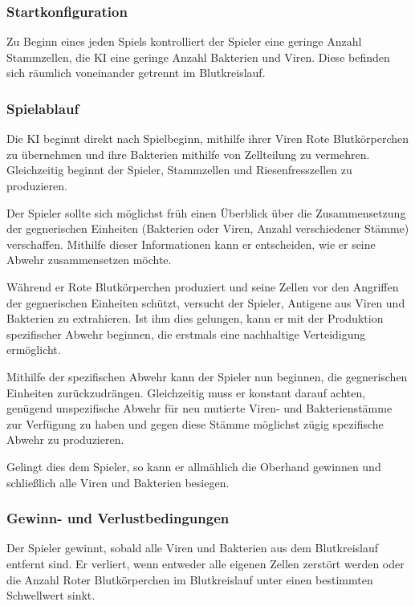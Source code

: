 \subsubsection{Startkonfiguration}

Zu Beginn eines jeden Spiels kontrolliert der Spieler eine geringe Anzahl
Stammzellen, die KI eine geringe Anzahl Bakterien und Viren. Diese befinden
sich räumlich voneinander getrennt im Blutkreislauf.

\subsubsection{Spielablauf}

Die KI beginnt direkt nach Spielbeginn, mithilfe ihrer Viren Rote
Blutkörperchen zu übernehmen und ihre Bakterien mithilfe von Zellteilung zu
vermehren. Gleichzeitig beginnt der Spieler, Stammzellen und Riesenfresszellen
zu produzieren.

Der Spieler sollte sich möglichst früh einen Überblick über die Zusammensetzung
der gegnerischen Einheiten (Bakterien oder Viren, Anzahl verschiedener Stämme)
verschaffen. Mithilfe dieser Informationen kann er entscheiden, wie er seine
Abwehr zusammensetzen möchte.

Während er Rote Blutkörperchen produziert und seine Zellen vor den Angriffen
der gegnerischen Einheiten schützt, versucht der Spieler, Antigene aus
Viren und Bakterien zu extrahieren. Ist ihm dies gelungen, kann er mit der
Produktion spezifischer Abwehr beginnen, die erstmals eine nachhaltige
Verteidigung ermöglicht.

Mithilfe der spezifischen Abwehr kann der Spieler nun beginnen, die
gegnerischen Einheiten zurückzudrängen. Gleichzeitig muss er konstant darauf
achten, genügend unspezifische Abwehr für neu mutierte Viren- und
Bakterienstämme zur Verfügung zu haben und gegen diese Stämme möglichst zügig
spezifische Abwehr zu produzieren.

Gelingt dies dem Spieler, so kann er allmählich die Oberhand gewinnen und
schließlich alle Viren und Bakterien besiegen.

\subsubsection{Gewinn- und Verlustbedingungen}

Der Spieler gewinnt, sobald alle Viren und Bakterien aus dem Blutkreislauf
entfernt sind. Er verliert, wenn entweder alle eigenen Zellen zerstört werden
oder die Anzahl Roter Blutkörperchen im Blutkreislauf unter einen bestimmten
Schwellwert sinkt.

